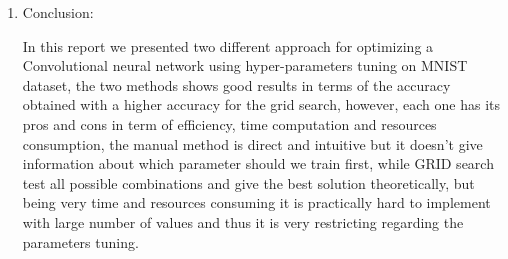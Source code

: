 \documentclass[12pt,a4paper]{report}
\begin{document}
\begin{enumerate}
\begin{enumerate}
\end{enumerate}

\item Conclusion:

In this report we presented two different approach for optimizing a Convolutional neural network using hyper-parameters tuning on MNIST dataset, the two methods shows good results in terms of the accuracy obtained with a higher accuracy for the grid search, however, each one has its pros and cons in term of efficiency, time computation and resources consumption, the manual method is direct and intuitive but it doesn't give information about which parameter should we train first, while GRID search test all possible combinations and give the best solution theoretically, but being very time and resources consuming it is practically hard to implement with large number of values and thus it is very restricting regarding the parameters tuning. 
     
\end{enumerate} 
\end{document}
